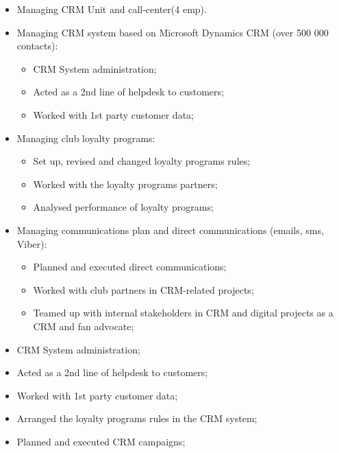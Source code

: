 \documentclass[11pt,a4paper,sans]{moderncv}
\begin{document}
\begin{itemize}
\item Managing CRM Unit and call-center(4 emp).
\item Managing CRM system based on Microsoft Dynamics CRM (over 500 000 contacts):
	\begin{itemize}
	\item CRM System administration;
	\item Acted as a 2nd line of helpdesk to customers;
	\item Worked with 1st party customer data;
	\end{itemize}
\item Managing club loyalty programs:
	\begin{itemize}
	\item Set up, revised and changed loyalty programs rules;
	\item Worked with the loyalty programs partners;
	\item Analysed performance of loyalty programs;
	\end{itemize}
\item Managing communications plan and direct communications (emails, sms, Viber):
	\begin{itemize}
	\item Planned and executed direct communications;
	\item Worked with club partners in CRM-related projects;
	\item Teamed up with internal stakeholders in CRM and digital projects as a CRM and fan advocate;\newline{}
	\end{itemize}
\end{itemize}


\begin{itemize}
\item CRM System administration;
\item Acted as a 2nd line of helpdesk to customers;
\item Worked with 1st party customer data;
\item Arranged the loyalty programs rules in the CRM system;
\item Planned and executed CRM campaigns;\newline{}
\end{itemize}
\end{document}
